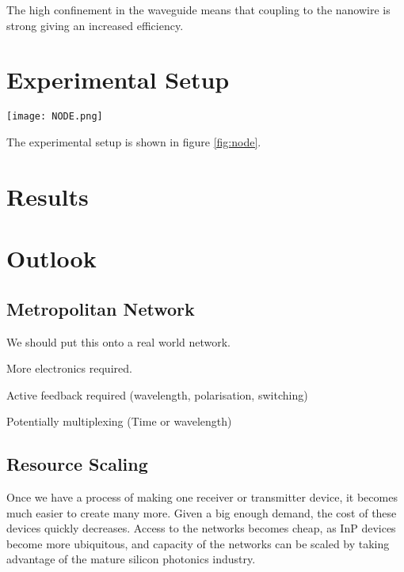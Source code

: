 The high confinement in the waveguide means that coupling to the nanowire is strong giving an increased efficiency. 

\section{Experimental Setup}

\begin{sidewaysfigure}
	\centering
	\texttt{[image: NODE.png]}
	\caption[Fully integrated QKD setup]{Experimental setup for fully integrated quantum key distribution. Alice and Bob use independent InP devices which generate BB84 states on-chip. The receiver (Charlie) is an SOI device with grating couplers and waveguide-integrated detectors.}
	\label{fig:node}
\end{sidewaysfigure}

The experimental setup is shown in figure \ref{fig:node}. 

\section{Results}

\section{Outlook}

\subsection{Metropolitan Network}

We should put this onto a real world network.

More electronics required.

Active feedback required (wavelength, polarisation, switching)

Potentially multiplexing (Time or wavelength)

\subsection{Resource Scaling}

Once we have a process of making one receiver or transmitter device, it becomes much easier to create many more. Given a big enough demand, the cost of these devices quickly decreases. Access to the networks becomes cheap, as \ac{InP} devices become more ubiquitous, and capacity of the networks can be scaled by taking advantage of the mature silicon photonics industry.

